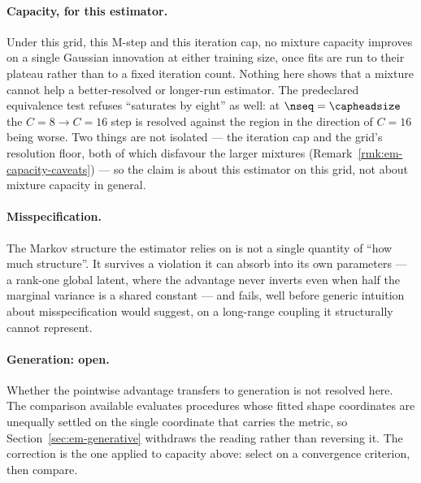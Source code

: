 \paragraph{Capacity, for this estimator.} Under this grid, this M-step and this
iteration cap, no mixture capacity improves on a single Gaussian innovation at
either training size, once fits are run to their plateau rather than to a fixed
iteration count. Nothing here shows that a mixture cannot help a better-resolved
or longer-run estimator. The predeclared equivalence test refuses
``saturates by eight'' as well: at $\nseq = \capheadsize$ the $C=8 \to C=16$
step is resolved against the region in the direction of $C=16$ being worse.
Two things are not isolated --- the iteration cap and the grid's resolution
floor, both of which disfavour the larger mixtures
(Remark~\ref{rmk:em-capacity-caveats}) --- so the claim is about this estimator
on this grid, not about mixture capacity in general.

\paragraph{Misspecification.} The Markov structure the estimator relies on is
not a single quantity of ``how much structure''. It survives a violation it can
absorb into its own parameters --- a rank-one global latent, where the advantage
never inverts even when half the marginal variance is a shared constant --- and
fails, well before generic intuition about misspecification would suggest, on a
long-range coupling it structurally cannot represent.

\paragraph{Generation: open.} Whether the pointwise advantage transfers to
generation is not resolved here. The comparison available evaluates procedures
whose fitted shape coordinates are unequally settled on the single coordinate
that carries the metric, so Section~\ref{sec:em-generative} withdraws the reading rather than
reversing it. The correction is the one applied to capacity above: select on a
convergence criterion, then compare.
